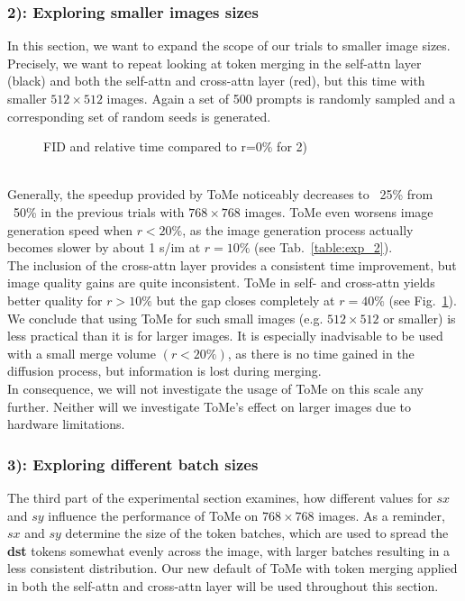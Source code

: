 \subsubsection*{2): Exploring smaller images sizes}
In this section, we want to expand the scope of our trials to smaller image sizes. Precisely, we want to repeat looking at token merging in the self-attn layer (black) and both the self-attn and cross-attn layer (red), but this time with smaller $512 \times 512$ images. Again a set of 500 prompts is randomly sampled and a corresponding set of random seeds is generated.
\begin{figure}[!htb]
    
    
\caption{FID and relative time compared to r=0\% for 2)}
\label{fig:exp_2}
\end{figure}\\
Generally, the speedup provided by ToMe noticeably decreases to ~25\% from ~50\% in the previous trials with \(768 \times 768\) images. ToMe even worsens image generation speed when \(r<20\%\), as the image generation process actually becomes slower by about 1 s/im at \(r=10\%\) (see Tab.~\ref{table:exp_2}).\\
The inclusion of the cross-attn layer provides a consistent time improvement, but image quality gains are quite inconsistent.
ToMe in self- and cross-attn yields better quality for \(r>10\%\) but the gap closes completely at \(r=40\%\) (see Fig.~\ref{fig:exp_2}).\\
We conclude that using ToMe for such small images (e.g. $512 \times 512$ or smaller) is less practical than it is for larger images. It is especially inadvisable to be used with a small merge volume \((r<20\%)\), as there is no time gained in the diffusion process, but information is lost during merging. \\
In consequence, we will not investigate the usage of ToMe on this scale any further. Neither will we investigate ToMe's effect on larger images due to hardware limitations.



\subsubsection*{3): Exploring different batch sizes}
The third part of the experimental section examines, how different values for \(sx\) and \(sy\) influence the performance of ToMe on $768 \times 768$ images. As a reminder, \(sx\) and \(sy\) determine the size of the token batches, which are used to spread the \textbf{dst} tokens somewhat evenly across the image, with larger batches resulting in a less consistent distribution. Our new default of ToMe with token merging applied in both the self-attn and cross-attn layer will be used throughout this section.




